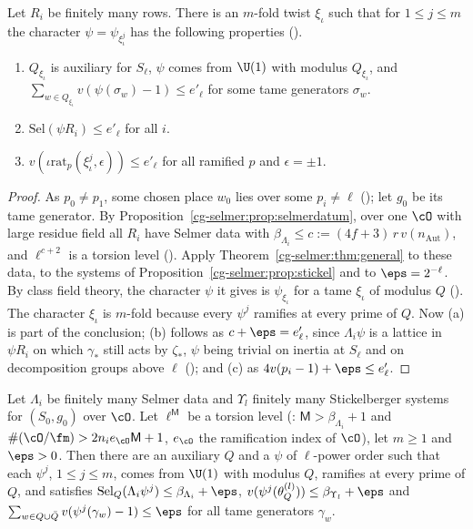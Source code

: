 \begin{theorem}\label{cg-selmer:thm:twisting}
Let $R_i$ be finitely many rows. There is an $m$-fold twist $\xi_\iota$ such that for $1\le j\le m$ the
character $\psi=\psi_{\xi_\iota^j}$ has the following properties
().
\begin{enumerate}[label=(\alph*)]
\item $Q_{\xi_\iota}$ is auxiliary for $S_\ell$, $\psi$ comes from $\U(1)$ with modulus $Q_{\xi_\iota}$, and
  $\sum_{w\in Q_{\xi_\iota}}v(\psi(\sigma_w)-1)\le e'_\ell$ for some tame generators $\sigma_w$.
\item $\mathrm{Sel}(\psi R_i)\le e'_\ell$ for all $i$.
\item $v(\iota\mathrm{rat}_p(\xi_\iota^j,\epsilon))\le e'_\ell$ for all ramified $p$ and $\epsilon=\pm1$.
\end{enumerate}
\end{theorem}

\begin{proof}
As $p_0\ne p_1$, some chosen place $w_0$ lies over some $p_i\ne\ell$
(); let $g_0$ be its tame generator. By
Proposition~\ref{cg-selmer:prop:selmerdatum}, over one $\cO$ with large residue field all $R_i$ have
Selmer data with $\beta_{\Lambda_i}\le c:=(4f+3)\,r\,v(n_{\mathrm{Aut}})$, and $\ell^{c+2}$ is a torsion level
(). Apply
Theorem~\ref{cg-selmer:thm:general} to these data, to the systems of
Proposition~\ref{cg-selmer:prop:stickel} and to $\eps=2^{-\ell}$. By class field theory, the character
$\psi$ it gives is $\psi_{\xi_\iota}$ for a tame $\xi_\iota$ of modulus $Q$
(). The character $\xi_\iota$ is $m$-fold because every
$\psi^j$ ramifies at every prime of $Q$. Now (a) is part of the conclusion; (b) follows as
$c+\eps=e'_\ell$, since $\Lambda_i\psi$ is a lattice in $\psi R_i$ on which $\gamma_*$ still acts by
$\zeta_*$, $\psi$ being trivial on inertia at $S_\ell$ and on decomposition groups above $\ell$
(); and (c) as
$4v(p_i-1)+\eps\le e'_\ell$.
\end{proof}

\begin{theorem}\label{cg-selmer:thm:general}
Let $\Lambda_i$ be finitely many Selmer data and $\Upsilon_l$ finitely many Stickelberger systems for $(S_0,g_0)$
over $\cO$. Let $\ell^{\mathsf M}$ be a torsion level (: $\mathsf M>\beta_{\Lambda_i}+1$ and
$\#(\cO/\fm)>2n_ie_\cO\mathsf M+1$, $e_\cO$ the ramification index of $\cO$), let $m\ge1$ and $\eps>0$. Then there are an auxiliary $Q$ and a
$\psi$ of $\ell$-power order such that each $\psi^j$, $1\le j\le m$, comes from $\U(1)$ with modulus
$Q$, ramifies at every prime of $Q$, and satisfies $\mathrm{Sel}_Q(\Lambda_i\psi^j)\le\beta_{\Lambda_i}+\eps$,
$v(\psi^j(\theta^{(l)}_Q))\le\beta_{\Upsilon_l}+\eps$ and $\sum_{w\in Q\cup\bar Q}v(\psi^j(\gamma_w)-1)\le
\eps$ for all tame generators $\gamma_w$.
\end{theorem}

